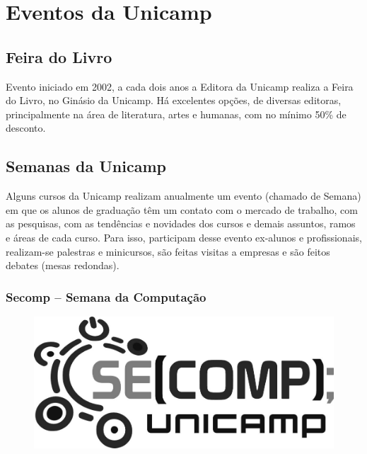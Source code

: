 
\section{Eventos da Unicamp}
\subsection{Feira do Livro}

Evento iniciado em 2002, a cada dois anos a Editora da Unicamp realiza a Feira
do Livro, no Ginásio da Unicamp. Há excelentes opções, de diversas editoras,
principalmente na área de literatura, artes e humanas, com no mínimo 50\% de
desconto.

\subsection{Semanas da Unicamp}

Alguns cursos da Unicamp realizam anualmente um evento (chamado de Semana) em
que os alunos de graduação têm um contato com o mercado de trabalho, com as
pesquisas, com as tendências e novidades dos cursos e demais assuntos, ramos e
áreas de cada curso. Para isso, participam desse evento ex-alunos e
profissionais, realizam-se palestras e minicursos, são feitas visitas a empresas
e são feitos debates (mesas redondas).

\subsubsection*{Secomp -- Semana da Computação}

\begin{figure}[H]
    \centering
    \includegraphics[scale=0.20]{img/alem_da_graduacao/secomp_logo.png}
\end{figure}

